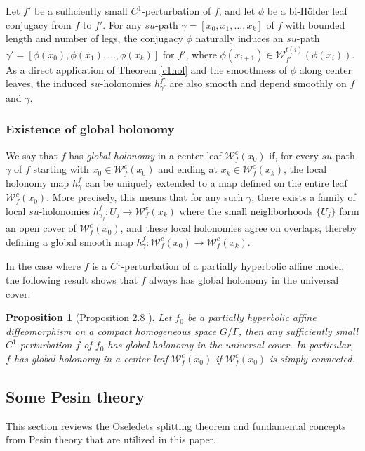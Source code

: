 \documentclass[11pt]{amsart}
\numberwithin{equation}{section}
\newcommand{\W}{\mathcal{W}}
\theoremstyle{plain}
\newtheorem{prop}[thm]{Proposition}
\begin{document}
Let $f'$ be a sufficiently small $C^1$-perturbation of $f$, and let $\phi$ be a bi-H\"older leaf conjugacy from $f$ to $f'$. For any $su$-path $\gamma = [x_0, x_1, \dots, x_k]$ of $f$ with bounded length and number of legs, the conjugacy $\phi$ naturally induces an $su$-path $\gamma' = [\phi(x_0), \phi(x_1), \dots, \phi(x_k)]$ for $f'$, where $\phi(x_{i+1}) \in \mathcal{W}^{t(i)}_{f'}(\phi(x_i))$. As a direct application of Theorem \ref{c1hol} and the smoothness of $\phi$ along center leaves, the induced $su$-holonomies $h^{f'}_{\gamma'}$ are also smooth and depend smoothly on $f$ and $\gamma$.

\subsubsection{Existence of global holonomy}
We say that $f$ has \emph{global holonomy} in a center leaf $\mathcal{W}^c_f(x_0)$ if, for every $su$-path $\gamma$ of $f$ starting with $x_0 \in \mathcal{W}^c_f(x_0)$ and ending at $x_k \in \mathcal{W}^c_f(x_k)$, the local holonomy map $h_\gamma^f$ can be uniquely extended to a map defined on the entire leaf $\mathcal{W}^c_f(x_0)$. More precisely, this means that for any such $\gamma$, there exists a family of local $su$-holonomies $h_{\gamma_j}^f: U_j \to \mathcal{W}^c_f(x_k)$ where the small neighborhoods $\{U_j\}$ form an open cover of $\mathcal{W}^c_f(x_0)$, and these local holonomies agree on overlaps, thereby defining a global smooth map $h_\gamma^f: \mathcal{W}^c_f(x_0) \to \mathcal{W}^c_f(x_k)$.

In the case where $f$ is a $C^1$-perturbation of a partially hyperbolic affine model, the following result shows that $f$ always has global holonomy in the universal cover.

\begin{prop}[Proposition 2.8 \cite{Wang}]
    Let $f_0$ be a partially hyperbolic affine diffeomorphism on a compact homogeneous space $G/\Gamma$, then any sufficiently small $C^1$-perturbation $f$ of $f_0$ has global holonomy in the universal cover. In particular, $f$ has global holonomy in a center leaf $\W^c_f(x_0)$ if $\W^c_f(x_0)$ is simply connected.
\end{prop}


\subsection{Some Pesin theory}
This section reviews the Oseledets splitting theorem and fundamental concepts from Pesin theory that are utilized in this paper.
\end{document}
